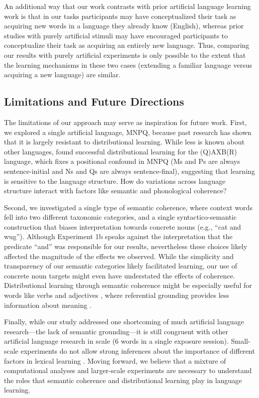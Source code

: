\documentclass[man,longtable, floatmark]{my-apa6}
\begin{document}
An additional way that our work contrasts with prior artificial language learning work is that in our tasks participants may have conceptualized their task as acquiring new words in a language they already know (English), whereas prior studies with purely artificial stimuli may have encouraged participants to conceptualize their task as acquiring an entirely new language. Thus, comparing our results with purely artificial experiments is only possible to the extent that the learning mechanisms in these two cases (extending a familiar language versus acquiring a new language) are similar.

\subsection{Limitations and Future Directions}

The limitations of our approach may serve as inspiration for future work. First, we explored a single artificial language, MNPQ, because past research has shown that it is largely resistant to distributional learning. While less is known about other languages, \cite{reeder2009} found successful distributional learning for the (Q)AXB(R) language, which fixes a positional confound in MNPQ (Ms and Ps are always sentence-initial and Ns and Qs are always sentence-final), suggesting that learning is sensitive to the language structure. How do variations across language structure interact with factors like semantic and phonological coherence?

Second, we investigated a single type of semantic coherence, where context words fell into two different taxonomic categories, and a single syntactico-semantic construction that biases interpretation towards concrete nouns (e.g., ``cat and wug''). Although Experiment 1b speaks against the interpretation that the predicate ``and'' was responsible for our results, nevertheless these choices likely affected the magnitude of the effects we observed. While the simplicity and transparency of our semantic categories likely facilitated learning, our use of concrete noun targets might even have understated the effects of coherence. Distributional learning through semantic coherence might be especially useful for words like verbs and adjectives \citep{redington1998}, where referential grounding provides less information about meaning \citep{gleitman1990}.

Finally, while our study addressed one shortcoming of much artificial language research---the lack of semantic grounding---it is still congruent with other artificial language research in scale (6 words in a single exposure session). Small-scale experiments do not allow strong inferences about the importance of different factors in lexical learning \citep{romberg2010, frank2013}. Moving forward, we believe that a mixture of computational analyses and larger-scale experiments are necessary to understand the roles that semantic coherence and distributional learning play in language learning.
\end{document}
